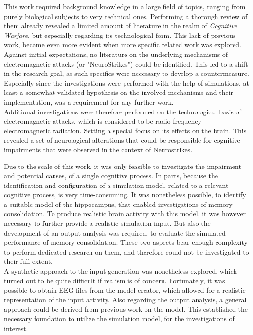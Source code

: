 This work required background knowledge in a large field of topics, ranging from purely biological subjects to very technical ones. Performing a thorough review of them already revealed a limited amount of literature in the realm of \textit{Cognitive Warfare}, but especially regarding its technological form. This lack of previous work, became even more evident when more specific related work was explored. Against initial expectations, no literature on the underlying mechanisms of electromagnetic attacks (or "NeuroStrikes") could be identified. This led to a shift in the research goal, as such specifics were necessary to develop a countermeasure. Especially since the investigations were performed with the help of simulations, at least a somewhat validated hypothesis on the involved mechanisms and their implementation, was a requirement for any further work.\\
Additional investigations were therefore performed on the technological basis of electromagnetic attacks, which is considered to be radio-frequency electromagnetic radiation. Setting a special focus on its effects on the brain. This revealed a set of neurological alterations that could be responsible for cognitive impairments that were observed in the context of Neurostrikes.

Due to the scale of this work, it was only feasible to investigate the impairment and potential causes, of a single cognitive process. In parts, because the identification and configuration of a simulation model, related to a relevant cognitive process, is very time-consuming. It was nonetheless possible, to identify a suitable model of the hippocampus, that enabled investigations of memory consolidation. To produce realistic brain activity with this model, it was however necessary to further provide a realistic simulation input. But also the development of an output analysis was required, to evaluate the simulated performance of memory consolidation. These two aspects bear enough complexity to perform dedicated research on them, and therefore could not be investigated to their full extent.\\
A synthetic approach to the input generation was nonetheless explored, which turned out to be quite difficult if realism is of concern. Fortunately, it was possible to obtain EEG files from the model creator, which allowed for a realistic representation of the input activity. Also regarding the output analysis, a general approach could be derived from previous work on the model. This established the necessary foundation to utilize the simulation model, for the investigations of interest. 


